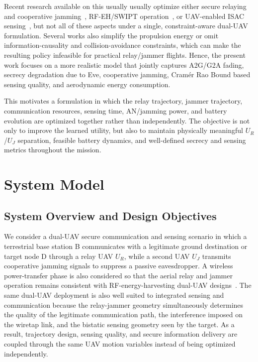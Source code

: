 \documentclass[journal]{IEEEtran}
\begin{document}
Recent research available on this usually usually optimize either secure relaying and cooperative jamming~\cite{pandeyswiptjam2025, pandeydualuav2026}, RF-EH/SWIPT operation~\cite{perera2018swipt, pandey2025rfeh}, or UAV-enabled ISAC sensing~\cite{zhang2023drlisac}, but not all of these aspects under a single, constraint-aware dual-UAV formulation. Several works also simplify the propulsion energy or omit information-causality and collision-avoidance constraints, which can make the resulting policy infeasible for practical relay/jammer flights. Hence, the present work focuses on a more realistic model that jointly captures A2G/G2A fading, secrecy degradation due to Eve, cooperative jamming, Cramér Rao Bound based sensing quality, and aerodynamic energy consumption.

This motivates a formulation in which the relay trajectory, jammer trajectory, communication resources, sensing time, AN/jamming power, and battery evolution are optimized together rather than independently. The objective is not only to improve the learned utility, but also to maintain physically meaningful $U_R$/$U_J$ separation, feasible battery dynamics, and well-defined secrecy and sensing metrics throughout the mission.

\section{System Model}
\label{sec:system}

\subsection{System Overview and Design Objectives}

We consider a dual-UAV secure communication and sensing scenario in which a terrestrial base station B communicates with a legitimate ground destination or target node D through a relay UAV $U_R$, while a second UAV $U_J$ transmits cooperative jamming signals to suppress a passive eavesdropper. A wireless power-transfer phase is also considered so that the aerial relay and jammer operation remains consistent with RF-energy-harvesting dual-UAV designs~\cite{pandeydualuav2026, pandey2025rfeh}. The same dual-UAV deployment is also well suited to integrated sensing and communication because the relay-jammer geometry simultaneously determines the quality of the legitimate communication path, the interference imposed on the wiretap link, and the bistatic sensing geometry seen by the target. As a result, trajectory design, sensing quality, and secure information delivery are coupled through the same UAV motion variables instead of being optimized independently.
\end{document}
